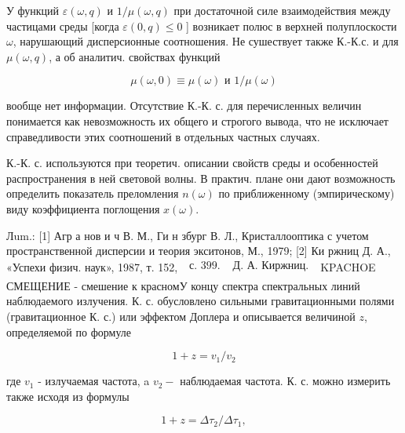 \documentclass[10pt]{article}
\begin{document}
У функций $\varepsilon(\omega, q)$ и $1 / \mu(\omega, q)$ при достаточной силе взаимодействия между частицами среды [когда $\varepsilon(0, q) \leqslant 0$ ] возникает полюс в верхней полуплоскости $\omega$, нарушающий дисперсионные соотношения. Не сушествует также К.-К.с. и для $\mu(\omega, q)$, а об аналитич. свойствах функций



\[

\mu(\omega, 0) \equiv \mu(\omega) \text { и } 1 / \mu(\omega)

\]



вообще нет информации. Отсутствие К.-К. с. для перечисленных величин понимается как невозможность их общего и строгого вывода, что не исключает справедливости этих соотношений в отдельных частных случаях.



К.-К. с. используются при теоретич. описании свойств среды и особенностей распространения в ней световой волны. В практич. плане они дают возможность определить показатель преломления $n(\omega)$ по приближенному (эмпирическому) виду коэффициента поглощения $x(\omega)$.



Лum.: [1] Агр а нов и ч В. М., Ги н збург В. Л., Кристаллооптика с учетом пространственной дисперсии и теория экситонов, М., 1979; [2] Ки ржниц Д. А., «Успехи физич. наук», 1987, т. 152, $\begin{array}{ll}\text { с. } 399 . & \text { Д. А. Киржниц. } \\ \end{array}$ KPACHOE СМЕЩЕНИЕ - смешение к красномУ концу спектра спектральных линий наблюдаемого излучения. К. с. обусловлено сильными гравитационными полями (гравитационное К. с.) или эффектом Доплера и описывается величиной $z$, определяемой по формуле



\[

1+z=v_{1} / v_{2}

\]



где $v_{1}$ - излучаемая частота, a $v_{2}-$ наблюдаемая частота. К. с. можно измерить также исходя из формулы



\[

1+z=\Delta \tau_{2} / \Delta \tau_{1},

\]
\end{document}

